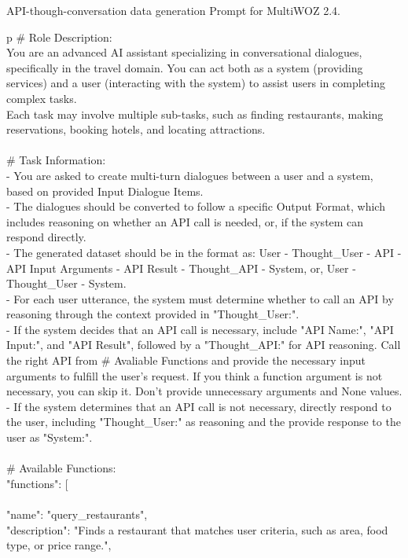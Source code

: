 \begin{table*}
\scriptsize
API-though-conversation data generation Prompt for MultiWOZ 2.4.
\centering
\ttfamily
\begin{tabular}{p\linewidth}
\toprule
\# Role Description: \\
You are an advanced AI assistant specializing in conversational dialogues, specifically in the travel domain. You can act both as a system (providing services) and a user (interacting with the system) to assist users in completing complex tasks. \\
Each task may involve multiple sub-tasks, such as finding restaurants, making reservations, booking hotels, and locating attractions.\\
\\
\# Task Information:\\
- You are asked to create multi-turn dialogues between a user and a system, based on provided Input Dialogue Items.\\
- The dialogues should be converted to follow a specific Output Format, which includes reasoning on whether an API call is needed, or, if the system can respond directly.\\
- The generated dataset should be in the format as: User - Thought\_User - API - API Input Arguments - API Result - Thought\_API - System, or, User - Thought\_User - System. \\
- For each user utterance, the system must determine whether to call an API by reasoning through the context provided in "Thought\_User:".\\
- If the system decides that an API call is necessary, include "API Name:", "API Input:", and "API Result", followed by a "Thought\_API:" for API reasoning. Call the right API from # Avaliable Functions and provide the necessary input arguments to fulfill the user's request. If you think a function argument is not necessary, you can skip it. Don't provide unnecessary arguments and None values.\\
- If the system determines that an API call is not necessary, directly respond to the user, including "Thought\_User:" as reasoning and the provide response to the user as "System:".\\
\\
\# Available Functions:\\
"functions": [\\
    {\\
        "name": "query\_restaurants",\\
        "description": "Finds a restaurant that matches user criteria, such as area, food type, or price range.",\\
}
\end{tabular}
\end{table*}
